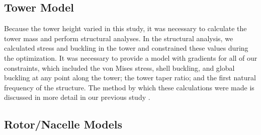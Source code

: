 \documentclass[WESD, manuscript]{copernicus}
\begin{document}
	\subsection{Tower Model}
	Because the tower height varied in this study, it was necessary to calculate the tower mass and perform structural analyses.
In the structural analysis, we calculated stress and buckling in the tower and constrained these values during the optimization.
It was necessary to provide a model with gradients for all of our constraints, which included the von Mises stress, shell buckling, and global buckling at any point along the tower; the tower taper ratio; and the first natural frequency of the structure. The method by which these calculations were made is discussed in more detail in our previous study \citep{stanley2018}.

	\subsection{Rotor/Nacelle Models}
	\label{rotor_nacelle}
\end{document}
